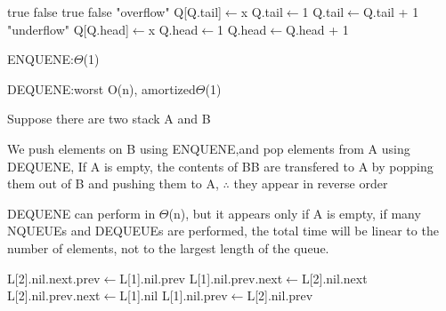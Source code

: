 \documentclass[a4paper, justified]{tufte-handout}
\begin{document}
\begin{solution}
  \begin{algorithm}
    \begin{algorithmic}[1]
      \Return true
      \Else
      \Return false
      \EndIf
      \EndProcedure
      \Return true
      \Else
      \Return false
      \EndIf
      \EndProcedure
      \Return "overflow"
      \Else
      \State Q[Q.tail]$\gets$x
      \State Q.tail$\gets$1
      \Else
      Q.tail$\gets$Q.tail + 1
      \EndIf
      \EndIf
      \EndProcedure
      \Return "underflow"
      \Else
      \State Q[Q.head]$\gets$x
      \State Q.head$\gets$1
      \Else
      Q.head$\gets$Q.head + 1
      \EndIf
      \EndIf
      \EndProcedure
    \end{algorithmic}
  \end{algorithm}
\end{solution}

\begin{problem}[TC 10.1-6]
\end{problem}

\begin{solution}
  ENQUENE:$\Theta$(1)

  DEQUENE:worst O(n), amortized$\Theta$(1)

  Suppose there are two stack A and B

  We push elements on B using ENQUENE,and pop elements from A using DEQUENE, If A is empty, the contents of BB are transfered to A by popping them out of B and pushing them to A, $\therefore$ they appear in reverse order

  DEQUENE can perform in $\Theta$(n), but it appears only if A is empty, if many NQUEUEs and DEQUEUEs are performed, the total time will be linear to the number of elements, not to the largest length of the queue.
\end{solution}

\begin{problem}[TC 10.2-6]
\end{problem}

\begin{solution}
  \begin{algorithm}
    \begin{algorithmic}[2]
      \State L[2].nil.next.prev$\gets$L[1].nil.prev
      \State L[1].nil.prev.next$\gets$L[2].nil.next
      \State L[2].nil.prev.next$\gets$L[1].nil
      \State L[1].nil.prev$\gets$L[2].nil.prev
      \EndProcedure
    \end{algorithmic}
  \end{algorithm}
\end{solution}
\end{document}
